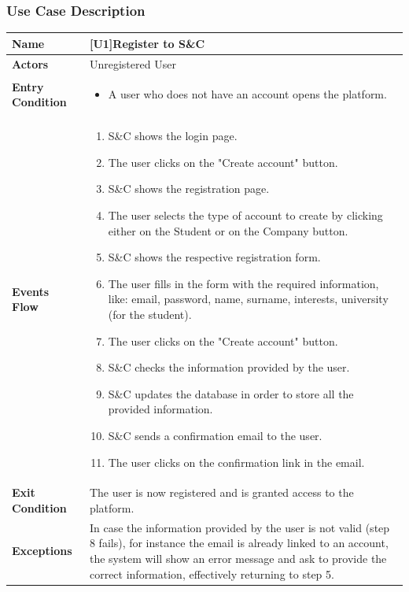 \subsubsection{Use Case Description}
\begin{center}
    \begin{tabular}{|p{9em}|p{27em}|}
        \hline
        \rowcolor{bluepoli!40}
        \textbf{Name} & \textbf{[U1]Register to S\&C} \\
        \hline
        \textbf{Actors} & Unregistered User \\
        \hline
        \textbf{Entry Condition} & 
            \begin{itemize}
                \item A user who does not have an account opens the platform. 
            \end{itemize} \\
        \hline
        \textbf{Events Flow} & 
        \begin{enumerate}
            \item S\&C shows the login page.
            \item The user clicks on the "Create account" button.
            \item S\&C shows the registration page.
            \item The user selects the type of account to create by clicking either on the Student or on the Company button.
            \item S\&C shows the respective registration form.
            \item The user fills in the form with the required information, like: email, password, name, surname, interests, university (for the student).
            \item The user clicks on the "Create account" button.
            \item S\&C checks the information provided by the user.
            \item S\&C updates the database in order to store all the provided information.
            \item S\&C sends a confirmation email to the user.
            \item The user clicks on the confirmation link in the email.
        \end{enumerate} \\
        \hline
        \textbf{Exit Condition} & The user is now registered and is granted access to the platform. \\
        \hline
        \textbf{Exceptions} & In case the information provided by the user is not valid (step 8 fails), for instance the email is already linked to 
        an account, the system will show an error message and ask to provide the correct information, effectively returning to step 5. \\
        \hline
    \end{tabular}
\end{center}

